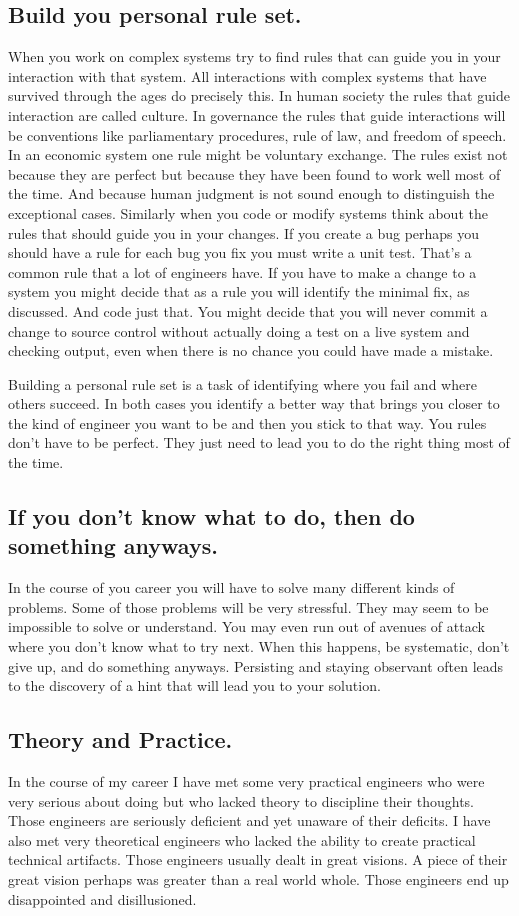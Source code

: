 \subsection{Build you personal rule set.}
When you work on complex systems try to find rules that can guide you in your interaction with that system. All interactions with complex systems
that have survived through the ages do precisely this. In human society the rules that guide interaction are called culture. In governance the
rules that guide interactions will be conventions like parliamentary procedures, rule of law, and freedom of speech. In an economic
system one rule might be voluntary exchange. The rules exist not because they are perfect but because they have been found to work well most
of the time. And because human judgment is not sound enough to distinguish the exceptional cases. Similarly when you code or modify systems think about the
rules that should guide you in your changes. If you create a bug perhaps you should have a rule for each bug you fix you must write a unit
test. That's a common rule that a lot of engineers have. If you have to make a change to a system you might decide that as a rule you will identify
the minimal fix, as discussed. And code just that. You might decide that you will never commit a change to source control without actually doing a
test on a live system and checking output, even when there is no chance you could have made a mistake.

Building a personal rule set is a task of identifying where you fail and where others succeed. In both cases you identify a better way that brings
you closer to the kind of engineer you want to be and then you stick to that way. You rules don't have to be perfect. They just need to lead you to do the
right thing most of the time. 

\subsection{If you don't know what to do, then do something anyways.}
In the course of you career you will have to solve many different kinds of problems. Some of those problems will be very stressful. They may
seem to be impossible to solve or understand. You may even run out of avenues of attack where you don't know what to try next. When this happens,
be systematic, don't give up, and do something anyways. Persisting and staying observant often leads to the discovery of a hint that will lead
you to your solution.

\subsection{Theory and Practice.}
In the course of my career I have met some very practical engineers who were very serious about doing but who lacked theory to
discipline their thoughts. Those engineers are seriously deficient and yet unaware of their deficits. I have also met very theoretical
engineers who lacked the ability to create practical technical artifacts. Those engineers usually dealt in great visions. A piece of
their great vision perhaps was greater than a real world whole. Those engineers end up disappointed and disillusioned.

